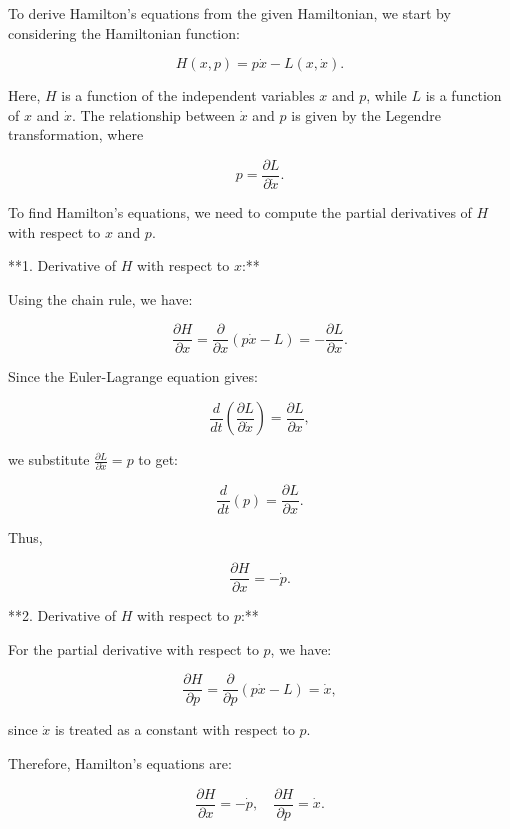 To derive Hamilton's equations from the given Hamiltonian, we start by considering the Hamiltonian function:

$$
H(x, p) = p \dot{x} - L(x, \dot{x}).
$$

Here, \( H \) is a function of the independent variables \( x \) and \( p \), while \( L \) is a function of \( x \) and \( \dot{x} \). The relationship between \( \dot{x} \) and \( p \) is given by the Legendre transformation, where

$$
p = \frac{\partial L}{\partial \dot{x}}.
$$

To find Hamilton's equations, we need to compute the partial derivatives of \( H \) with respect to \( x \) and \( p \).

**1. Derivative of \( H \) with respect to \( x \):**

Using the chain rule, we have:

$$
\frac{\partial H}{\partial x} = \frac{\partial}{\partial x} (p \dot{x} - L) = -\frac{\partial L}{\partial x}.
$$

Since the Euler-Lagrange equation gives:

$$
\frac{d}{dt} \left( \frac{\partial L}{\partial \dot{x}} \right) = \frac{\partial L}{\partial x},
$$

we substitute \( \frac{\partial L}{\partial \dot{x}} = p \) to get:

$$
\frac{d}{dt}(p) = \frac{\partial L}{\partial x}.
$$

Thus,

$$
\frac{\partial H}{\partial x} = -\dot{p}.
$$

**2. Derivative of \( H \) with respect to \( p \):**

For the partial derivative with respect to \( p \), we have:

$$
\frac{\partial H}{\partial p} = \frac{\partial}{\partial p} (p \dot{x} - L) = \dot{x},
$$

since \( \dot{x} \) is treated as a constant with respect to \( p \).

Therefore, Hamilton's equations are:

$$
\frac{\partial H}{\partial x} = -\dot{p}, \quad \frac{\partial H}{\partial p} = \dot{x}.
$$